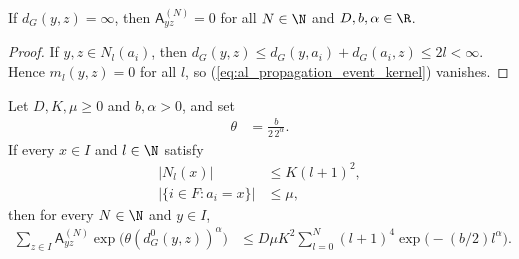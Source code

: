 \begin{lemma}
    \label{thm:al_graph_kernel_disconnected}
    \leanok
    If $d_G(y,z)=\infty$, then $\mathsf A^{(N)}_{yz}=0$ for all $N\in\N$ and
    $D,b,\alpha\in\R$.
\end{lemma}
\begin{proof}
    \leanok
    If $y,z\in N_l(a_i)$, then $d_G(y,z)\le d_G(y,a_i)+d_G(a_i,z)\le2l<\infty$.
    Hence $m_l(y,z)=0$ for all $l$, so
    (\ref{eq:al_propagation_event_kernel}) vanishes.
\end{proof}

\begin{lemma}
    \label{thm:al_graph_kernel_finite_row}
    \leanok
    Let $D,K,\mu\ge0$ and $b,\alpha>0$, and set
    \begin{align}
        \label{eq:al_propagation_row_weight}
        \theta & =\frac{b}{2\,2^\alpha}.
    \end{align}
    If every $x\in I$ and $l\in\N$ satisfy
    \begin{align}
        \label{eq:al_propagation_ball_growth}
        |N_l(x)|           & \le K(l+1)^2, \\
        \label{eq:al_propagation_anchor_fiber}
        |\{i\in F:a_i=x\}| & \le\mu,
    \end{align}
    then for every $N\in\N$ and $y\in I$,
    \begin{align}
        \label{eq:al_propagation_finite_row}
        \sum_{z\in I}\mathsf A^{(N)}_{yz}
        \exp\bigl(\theta(d_G^0(y,z))^\alpha\bigr)
         & \le D\mu K^2\sum_{l=0}^{N}(l+1)^4\exp\bigl(-(b/2)l^\alpha\bigr).
    \end{align}
\end{lemma}
